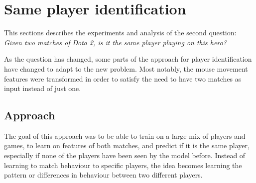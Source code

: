 \documentclass[Report.tex]{subfiles}
\begin{document}
\section{Same player identification}\label{sec:pair-classification}
This sections describes the experiments and analysis of the second question: \textit{Given two matches of Dota 2, is it the same player playing on this hero?}

As the question has changed, some parts of the approach for player identification have changed to adapt to the new problem. Most notably, the mouse movement features were transformed in order to satisfy the need to have two matches as input instead of just one. 

\subsection{Approach}

The goal of this approach was to be able to train on a large mix of players and games, to learn on features of both matches, and predict if it is the same player, especially if none of the players have been seen by the model before. Instead of learning to match behaviour to specific players, the idea becomes learning the pattern or differences in behaviour between two different players. 
\end{document}
